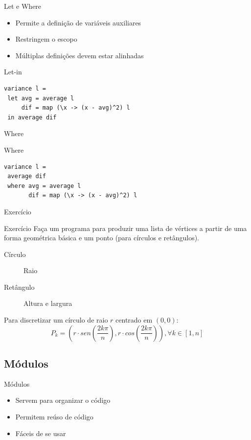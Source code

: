 \documentclass{beamer}
\begin{document}
		
		\begin{frame}[fragile]{Let e Where}
		 \begin{itemize}
		  \item Permite a definição de variáveis auxiliares
		  \item Restringem o escopo
		  \item Múltiplas definições devem estar alinhadas
		 \end{itemize}
		 \begin{block}{Let-in}
		  \begin{lstlisting}
variance l =
 let avg = average l
     dif = map (\x -> (x - avg)^2) l
 in average dif
		  \end{lstlisting}	  
		 \end{block}
		\end{frame}
		
		\begin{frame}[fragile]{Where}
		 \begin{block}{Where}
		  \begin{lstlisting}
variance l =
 average dif
 where avg = average l
       dif = map (\x -> (x - avg)^2) l
		  \end{lstlisting}
		 \end{block}		 
		\end{frame}
		
		\begin{frame}{Exercício}
		 \begin{block}{Exercício}
		  Faça um programa para produzir uma lista de vértices a partir de uma forma geométrica básica e um ponto (para círculos e retângulos).
		 \end{block}
		 \begin{description}
		  \item [Círculo] Raio
		  \item [Retângulo] Altura e largura
		 \end{description}
		 Para discretizar um círculo de raio $r$ centrado em $(0,0)$:
		 \[
		  P_k = ( r \cdot sen(\frac{2 k \pi}{n}) , r \cdot cos(\frac{2 k \pi}{n} ) ) , \forall k \in [1,n]
		 \]


		\end{frame}
		
		\subsection{Módulos}
			\begin{frame}[fragile]{Módulos}
			 \begin{itemize}
			  \item Servem para organizar o código
			  \item Permitem reúso de código
			  \item Fáceis de se usar
			 \end{itemize}
			\end{frame}
			
\end{document}
